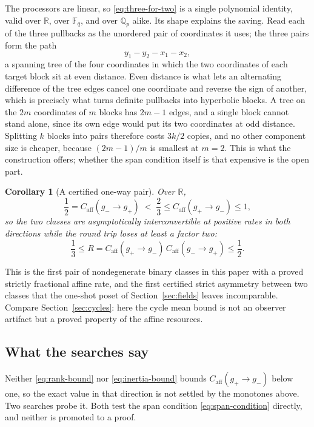 \documentclass[11pt]{article}
\theoremstyle{definition}
\theoremstyle{plain}
\newtheorem{corollary}[definition]{Corollary}
\theoremstyle{remark}
\newcommand{\F}{\mathbb F}
\newcommand{\Q}{\mathbb Q}
\newcommand{\R}{\mathbb R}
\newcommand{\caff}{C_{\mathrm{aff}}}
\begin{document}
The processors are linear, so \eqref{eq:three-for-two} is a single polynomial
identity, valid over \(\R\), over \(\F_q\), and over \(\Q_p\) alike.  Its
shape explains the saving.  Read each of the three pullbacks as the unordered
pair of coordinates it uses; the three pairs form the path
\[
  y_1-y_2-x_1-x_2 ,
\]
a spanning tree of the four coordinates in which the two coordinates of each
target block sit at even distance.  Even distance is what lets an alternating
difference of the tree edges cancel one coordinate and reverse the sign of
another, which is precisely what turns definite pullbacks into hyperbolic
blocks.  A tree on the \(2m\) coordinates of \(m\) blocks has \(2m-1\) edges, and a
single block cannot stand alone, since its own edge would put its two
coordinates at odd distance.  Splitting \(k\) blocks into pairs therefore
costs \(3k/2\) copies, and no other component size is cheaper, because
\((2m-1)/m\) is smallest at \(m=2\).  This is what the construction offers;
whether the span condition itself is that expensive is the open part.

\begin{corollary}[A certified one-way pair]
\label{cor:one-way-pair}
Over \(\R\),
\[
  \frac12=\caff(g_-\to g_+)
  \;<\;\frac23\le\caff(g_+\to g_-)\le1 ,
\]
so the two classes are asymptotically interconvertible at positive rates in
both directions while the round trip loses at least a factor two:
\[
  \frac13\le
  R=\caff(g_+\to g_-)\,\caff(g_-\to g_+)\le\frac12 .
\]
\end{corollary}

This is the first pair of nondegenerate binary classes in this paper with a
proved strictly fractional affine rate, and the first certified strict
asymmetry between two classes that the one-shot poset of
Section~\ref{sec:fields} leaves incomparable.  Compare
Section~\ref{sec:cycles}: here the cycle mean bound is not an observer
artifact but a proved property of the affine resources.

\subsection{What the searches say}

Neither \eqref{eq:rank-bound} nor \eqref{eq:inertia-bound} bounds
\(\caff(g_+\to g_-)\) below one, so the exact value in that direction is not
settled by the monotones above.  Two searches probe it.  Both test the span
condition \eqref{eq:span-condition} directly, and neither is promoted to a
proof.
\end{document}
